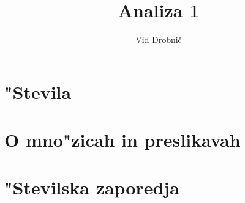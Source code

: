 \documentclass[a4paper, 12pt]{article}
\title{Analiza 1}
\author{Vid Drobnič}
\date{}
\begin{document}
	\maketitle
	\thispagestyle{empty}
	\pagebreak
	\setcounter{page}{1}

	\tableofcontents
	\pagebreak

	\section{"Stevila}
	
	
	\section{O mno"zicah in preslikavah}
	
	
	\section{"Stevilska zaporedja}
	
\end{document}
